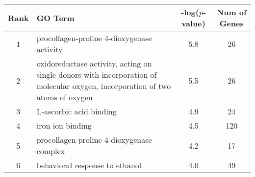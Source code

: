 \centering \begin{tabular}{c|p{4in}|c|c}
Rank	&GO Term	&-log($p$-value)	&Num of Genes\\\hline
1	&procollagen-proline 4-dioxygenase activity	&5.8	&26\\
2	&oxidoreductase activity, acting on single donors with incorporation of molecular oxygen, incorporation of two atoms of oxygen	&5.5	&26\\
3	&L-ascorbic acid binding	&4.9	&24\\
4	&iron ion binding	&4.5	&120\\
5	&procollagen-proline 4-dioxygenase complex	&4.2	&17\\
6	&behavioral response to ethanol	&4.0	&49\\
\end{tabular}
